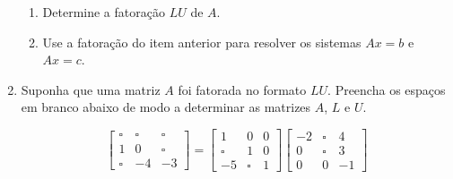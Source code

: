 \documentclass[12pt,a4paper]{article}
\begin{document}
\begin{enumerate}
  \begin{enumerate}
    \item Determine a fatoração $LU$ de $A$.
    \item Use a fatoração do item anterior para resolver os sistemas $Ax = b$ e $Ax = c$.
  \end{enumerate}

  \item Suponha que uma matriz $A$ foi fatorada no formato $LU$. Preencha os espaços em branco abaixo de modo a determinar 
as matrizes $A$, $L$ e $U$.

$$
\begin{bmatrix}\square & \square & \square \\ 1 & 0 & \square \\ \square & -4 & -3\end{bmatrix} = 
\begin{bmatrix}1 & 0 & 0 \\ \square & 1 & 0 \\ -5 & \square & 1\end{bmatrix}
\begin{bmatrix}-2 & \square & 4 \\ 0 & \square & 3 \\ 0 & 0 & -1\end{bmatrix}
$$

\end{enumerate}
\end{document}
